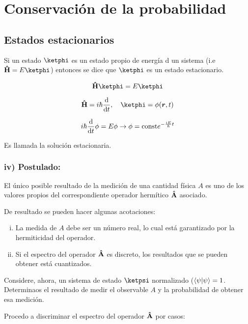 \section{Conservación de la probabilidad}
 \subsection{Estados estacionarios}

   \begin{definition}
     Si un estado $\ketphi$ es un estado propio de energía d un sistema (i.e $\vu{H}=E\ketphi$) entonces se dice que $\ketphi$ es un estado estacionario.
   \end{definition}

   $$
     \vu{H}\ketphi=E\ketphi
   $$

   $$
     \vu{H}=i\hbar\dv{t}  \qc\ketphi=\phi(\vb*{r},t)
   $$

   $$
     i\hbar\dv{t}\phi=E\phi\rightarrow\phi=\text{const}e^{-\frac{iE}{\hbar}t}
   $$

   Es llamada la solución estacionaria.

   \subsubsection{iv) Postulado:}
     El único posible resultado de la medición de una cantidad física $A$ es uno de los valores propios del correspondiente operador hermítico $\vu{A}$ asociado.

     De resultado se pueden hacer algunas acotaciones:
     \begin{enumerate}[i)]
       \item La medida de $A$ debe ser un número real, lo cual está garantizado por la hermiticidad del operador.
       \item Si el espectro del operador $\vu{A}$ es discreto, los resultados que se pueden obtener está cuantizados.
     \end{enumerate}

     Considere, ahora, un sistema de estado $\ketpsi$ normalizado ($\braket{\psi}=1$. Determinaos el resultado de medir el observable $A$ y la probabilidad de obtener esa medición.

     Procedo a discriminar el espectro del operador $\vu{A}$ por casos:


